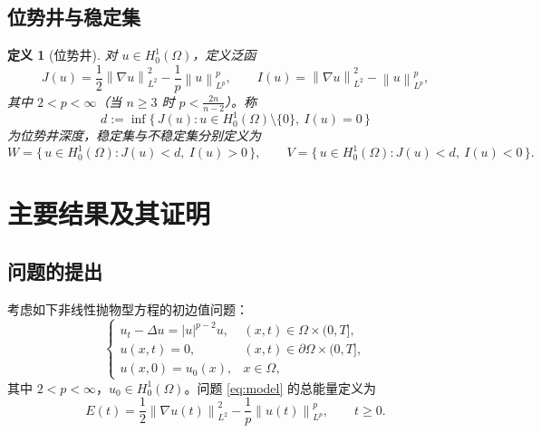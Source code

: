 \documentclass[12pt,a4paper,twoside,openright]{ctexbook}
\numberwithin{figure}{chapter}
\numberwithin{table}{chapter}
\numberwithin{equation}{chapter}
\theoremstyle{ncwuthm}
\newtheorem{definition}{定义}[chapter]
\newcommand{\norm}[1]{\left\lVert #1 \right\rVert}
\newcommand{\abs}[1]{\left\lvert #1 \right\rvert}
\begin{document}
\section{位势井与稳定集}
\begin{definition}[位势井]
对 $u\in H^1_0(\Omega)$，定义泛函
\begin{equation}
  J(u) = \frac12 \norm{\nabla u}_{L^2}^2 - \frac1p \norm{u}_{L^p}^p ,
  \qquad
  I(u) = \norm{\nabla u}_{L^2}^2 - \norm{u}_{L^p}^p ,
  \label{eq:JI}
\end{equation}
其中 $2<p<\infty$（当 $n\geq 3$ 时 $p<\frac{2n}{n-2}$）。称
\begin{equation}
  d := \inf\bigl\{\, J(u) : u\in H^1_0(\Omega)\setminus\{0\},\ I(u)=0 \,\bigr\}
  \label{eq:welldepth}
\end{equation}
为位势井深度，稳定集与不稳定集分别定义为
\begin{equation}
  W = \{\,u\in H^1_0(\Omega): J(u)<d,\ I(u)>0\,\},\qquad
  V = \{\,u\in H^1_0(\Omega): J(u)<d,\ I(u)<0\,\}.
  \label{eq:WV}
\end{equation}
\end{definition}

 
\chapter{主要结果及其证明}
\label{chap:main}
\section{问题的提出}
考虑如下非线性抛物型方程的初边值问题：
\begin{equation}
  \begin{cases}
    u_t - \Delta u = \abs{u}^{p-2}u, & (x,t)\in \Omega\times(0,T],\\[4pt]
    u(x,t) = 0,                      & (x,t)\in \partial\Omega\times(0,T],\\[4pt]
    u(x,0) = u_0(x),                 & x\in \Omega,
  \end{cases}
  \label{eq:model}
\end{equation}
其中 $2<p<\infty$，$u_0\in H^1_0(\Omega)$。问题 \eqref{eq:model} 的总能量定义为
\begin{equation}
  E(t) = \frac12 \norm{\nabla u(t)}_{L^2}^2 - \frac1p \norm{u(t)}_{L^p}^p ,
  \qquad t\geq 0 .
  \label{eq:energy}
\end{equation}
\end{document}
